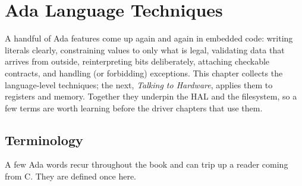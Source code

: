 \chapter{Ada Language Techniques}
\label{ch:embedded}

A handful of Ada features come up again and again in embedded code: writing
literals clearly, constraining values to only what is legal, validating data that
arrives from outside, reinterpreting bits deliberately, attaching checkable
contracts, and handling (or forbidding) exceptions. This chapter collects the
language-level techniques; the next, \emph{Talking to Hardware}, applies them to
registers and memory. Together they underpin the HAL and the filesystem, so a few
terms are worth learning before the driver chapters that use them.

\section{Terminology}
\label{sec:terms}

A few Ada words recur throughout the book and can trip up a reader coming from C.
They are defined once here.

